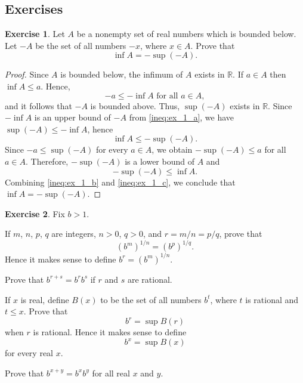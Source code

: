 \documentclass[11pt]{article}
\theoremstyle{definition}
\newtheorem{exercise}{Exercise}
\theoremstyle{plain}
\theoremstyle{remark}
\newcommand{\R}{\mathbb{R}}
\begin{document}
\subsection{Exercises}
\begin{exercise}
Let $A$ be a nonempty set of real numbers which is bounded below.
Let $-A$ be the set of all numbers $-x$, where $x \in A$.
Prove that \[\inf A = -\sup (-A).\]
\end{exercise}
\begin{proof}
Since $A$ is bounded below, the infimum of $A$ exists in $\R$. 
If $a \in A$ then $\inf A \leq a$. Hence,
\begin{equation}\label{ineq:ex_1_a}
-a \leq -\inf A \text{ for all } a \in A,
\end{equation}
and it follows that $-A$ is bounded above. Thus, $\sup (-A)$ exists in $\R$.
Since $- \inf A$ is an upper bound of $-A$ from \eqref{ineq:ex_1_a}, we have $\sup (-A) \leq -\inf A$, hence 
\begin{equation}\label{ineq:ex_1_b}
\inf A \leq -\sup(-A).
\end{equation}
Since $-a \leq \sup(-A)$ for every $a \in A$, we obtain $-\sup (-A) \leq a$ for all $a \in A$.
Therefore, $-\sup(-A)$ is a lower bound of $A$ and 
\begin{equation}\label{ineq:ex_1_c}
-\sup(-A) \leq  \inf A.
\end{equation}
Combining \eqref{ineq:ex_1_b} and \eqref{ineq:ex_1_c}, we conclude that $\inf A = -\sup (-A)$.
\end{proof}
\begin{exercise}
Fix $b>1$.
\item[(a)] If $m$, $n$, $p$, $q$ are integers, $n>0$, $q>0$, and $r=m/n=p/q$, prove that 
 \[
 (b^m)^{1/n}=(b^p)^{1/q}.
 \]
 Hence it makes sense to define $b^r = (b^m)^{1/n}$.
 \item[(b)] Prove that $b^{r+s} = b^r b^s$ if $r$ and $s$ are rational.
 \item[(c)] If $x$ is real, define $B(x)$ to be the set of all numbers $b^t$, where $t$ is rational and $t \leq x$. 
Prove that \[b^r = \sup B(r)\] when $r$ is rational.
Hence it makes sense to define \[b^x = \sup B(x)\] for every real $x$.
\item[(d)] Prove that $b^{x+y}=b^xb^y$ for all real $x$ and $y$.

\end{exercise}
\end{document}
